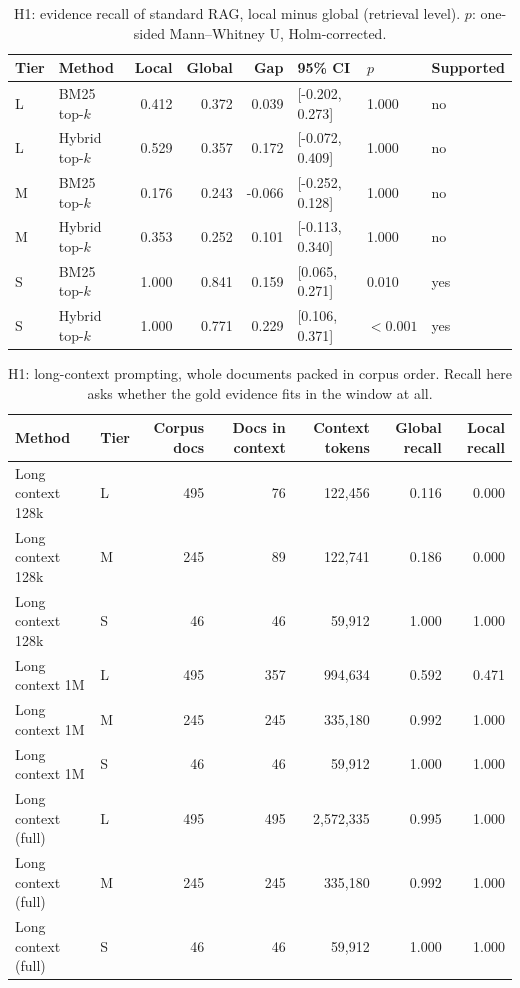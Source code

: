 \documentclass[11pt]{article}
\begin{document}
\begin{table}[htbp]
\centering\small
\caption{H1: evidence recall of standard RAG, local minus global (retrieval level). $p$: one-sided Mann--Whitney U, Holm-corrected.}
\label{tab:h1}
\begin{tabular}{llrrrlll}
\toprule
Tier & Method & Local & Global & Gap & 95\% CI & $p$ & Supported \\
\midrule
L & BM25 top-$k$ & 0.412 & 0.372 & 0.039 & [-0.202, 0.273] & 1.000 & no \\
L & Hybrid top-$k$ & 0.529 & 0.357 & 0.172 & [-0.072, 0.409] & 1.000 & no \\
M & BM25 top-$k$ & 0.176 & 0.243 & -0.066 & [-0.252, 0.128] & 1.000 & no \\
M & Hybrid top-$k$ & 0.353 & 0.252 & 0.101 & [-0.113, 0.340] & 1.000 & no \\
S & BM25 top-$k$ & 1.000 & 0.841 & 0.159 & [0.065, 0.271] & 0.010 & yes \\
S & Hybrid top-$k$ & 1.000 & 0.771 & 0.229 & [0.106, 0.371] & $<0.001$ & yes \\
\bottomrule
\end{tabular}
\end{table}

\begin{table}[htbp]
\centering\small
\caption{H1: long-context prompting, whole documents packed in corpus order. Recall here asks whether the gold evidence fits in the window at all.}
\label{tab:h1lc}
\begin{tabular}{llrrrrr}
\toprule
Method & Tier & Corpus docs & Docs in context & Context tokens & Global recall & Local recall \\
\midrule
Long context 128k & L & 495 & 76 & 122,456 & 0.116 & 0.000 \\
Long context 128k & M & 245 & 89 & 122,741 & 0.186 & 0.000 \\
Long context 128k & S & 46 & 46 & 59,912 & 1.000 & 1.000 \\
Long context 1M & L & 495 & 357 & 994,634 & 0.592 & 0.471 \\
Long context 1M & M & 245 & 245 & 335,180 & 0.992 & 1.000 \\
Long context 1M & S & 46 & 46 & 59,912 & 1.000 & 1.000 \\
Long context (full) & L & 495 & 495 & 2,572,335 & 0.995 & 1.000 \\
Long context (full) & M & 245 & 245 & 335,180 & 0.992 & 1.000 \\
Long context (full) & S & 46 & 46 & 59,912 & 1.000 & 1.000 \\
\bottomrule
\end{tabular}
\end{table}
\end{document}
